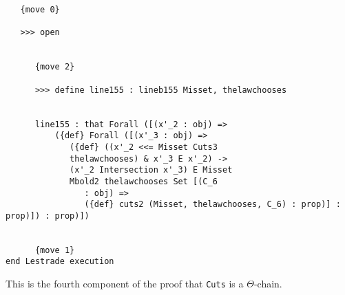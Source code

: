 \documentclass[12pt]{article}
\begin{document}
\begin{verbatim}
   {move 0}

   >>> open


      {move 2}

      >>> define line155 : lineb155 Misset, thelawchooses


      line155 : that Forall ([(x'_2 : obj) => 
          ({def} Forall ([(x'_3 : obj) => 
             ({def} ((x'_2 <<= Misset Cuts3 
             thelawchooses) & x'_3 E x'_2) -> 
             (x'_2 Intersection x'_3) E Misset 
             Mbold2 thelawchooses Set [(C_6 
                : obj) => 
                ({def} cuts2 (Misset, thelawchooses, C_6) : prop)] : prop)]) : prop)])


      {move 1}
end Lestrade execution
\end{verbatim}

This is the fourth component of the proof that {\tt Cuts} is a $\Theta$-chain.
\end{document}
